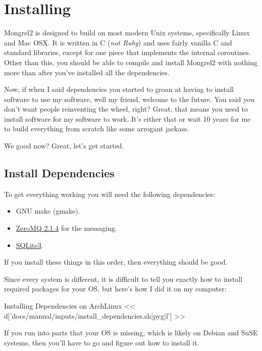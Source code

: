 \chapter{Installing}

Mongrel2 is designed to build on most modern Unix systems, specifically Linux
and Mac OSX.  It is written in C (\emph{not Ruby}) and uses fairly vanilla
C and standard libraries, except for one piece that implements the internal
coroutines.  Other than this, you should be able to compile and install Mongrel2
with nothing more than  after you've installed
all the dependencies.

Now, if when I said dependencies you started to groan at having to install
software to use my software, well my friend, welcome to the future.  You
said you don't want people reinventing the wheel, right?  Great, that means
you need to install software for my software to work.  It's either that or
wait 10 years for me to build everything from scratch like some arrogant
jackass.

We good now?  Great, let's get started.

\section{Install Dependencies}

To get everything working you will need the following dependencies:

\begin{itemize}
\item GNU make (gmake).
\item \href{http://zeromq.org}{ZeroMQ 2.1.4} for the messaging.
\item \href{http://www.sqlite.org/}{SQLite3}.
\end{itemize}

If you install these things in this order, then everything should be good.

Since every system is different, it is difficult to tell you exactly how to
install required packages for your OS, but here's how I did it on my computer:

\begin{code}{Installing Dependencies on ArchLinux}
<< d['docs/manual/inputs/install_dependencies.sh|pyg|l'] >>
\end{code}

If you run into parts that your OS is missing, which is likely on
Debian and SuSE systems, then you'll have to go and figure out
how to install it. 

